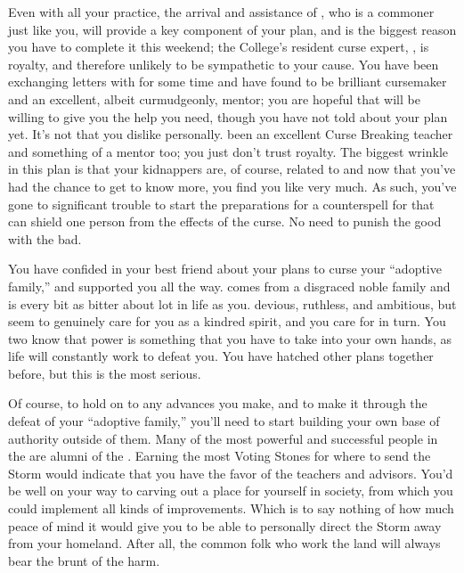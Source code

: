 \documentclass[char]{GL2020}
\begin{document}
Even with all your practice, the arrival and assistance of \cCurse{\full}, who is a commoner just like you, will provide a key component of your plan, and is the biggest reason you have to complete it this weekend; the College's resident curse expert, \cPrince{\Heir} \cPrince{}, is \pFarm{} royalty, and therefore unlikely to be sympathetic to your cause. You have been exchanging letters with \cCurse{} for some time and have found \cCurse{\them} to be brilliant cursemaker and an excellent, albeit curmudgeonly, mentor; you are hopeful that \cCurse{\they} will be willing to give you the help you need, though you have not told \cCurse{\them} about your plan yet. It's not that you dislike \cPrince{} personally. \cPrince{\They} \cPrince{\have} been an excellent Curse Breaking teacher and something of a mentor too; you just don't trust royalty. The biggest wrinkle in this plan is that your kidnappers are, of course, related to \cMusic{} and now that you've had the chance to get to know \cMusic{\them} more, you find you like \cMusic{\them} very much. As such, you've gone to significant trouble to start the preparations for a counterspell for \cMusic{\them} that can shield one person from the effects of the curse. No need to punish the good with the bad.

You have confided in your best friend \cLibAssist{\full} about your plans to curse your “adoptive family,” and \cLibAssist{\they} \cLibAssist{\have} supported you all the way. \cLibAssist{} comes from a disgraced noble family and is every bit as bitter about \cLibAssist{\their} lot in life as you.  \cLibAssist{\They} \cLibAssist{\are} devious, ruthless, and ambitious, but seem\cLibAssist{\verbs} to genuinely care for you as a kindred spirit, and you care for \cLibAssist{\them} in turn. You two know that power is something that you have to take into your own hands, as life will constantly work to defeat you. You have hatched other plans together before, but this is the most serious.  

Of course, to hold on to any advances you make, and to make it through the defeat of your ``adoptive family,'' you'll need to start building your own base of authority outside of them. Many of the most powerful and successful people in the \pFarm{} are alumni of the \pSchool{}. Earning the most Voting Stones for where to send the Storm would indicate that you have the favor of the teachers and advisors. You'd be well on your way to carving out a place for yourself in \pFarm{} society, from which you could implement all kinds of improvements. Which is to say nothing of how much peace of mind it would give you to be able to personally direct the Storm away from your homeland. After all, the common folk who work the land will always bear the brunt of the harm.
\end{document}
